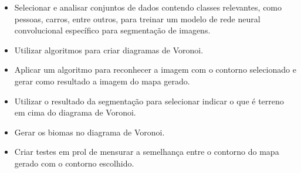 \begin{itemize}
	\item Selecionar e analisar conjuntos de dados contendo classes relevantes, como pessoas, carros, entre outros, para treinar um modelo de rede neural convolucional específico para segmentação de imagens.
	\item Utilizar algoritmos para criar diagramas de Voronoi.
	\item Aplicar um algoritmo para reconhecer a imagem com o contorno selecionado e gerar como resultado a imagem do mapa gerado.
	\item Utilizar o resultado da segmentação para selecionar indicar o que é terreno em cima do diagrama de Voronoi.
	\item Gerar os biomas no diagrama de Voronoi.
	\item Criar testes em prol de mensurar a semelhança entre o contorno do mapa gerado com o contorno escolhido.
\end{itemize}